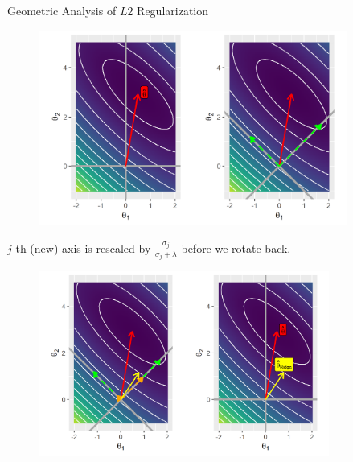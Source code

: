 \documentclass[11pt,compress,t,notes=noshow, xcolor=table]{beamer}
\begin{document}
\begin{vbframe}{Geometric Analysis of $L2$ Regularization}
\begin{figure}
\includegraphics[width=0.9\textwidth]{figure/l2_reg_hess_01.png}\\
\end{figure}




\framebreak
  
$j$-th (new) axis is rescaled by $\frac{\sigma_j}{\sigma_j + \lambda}$ before we rotate back.

\begin{figure}
\includegraphics[width=0.85\textwidth]{figure/l2_reg_hess_03.png}\\
\end{figure}



\end{vbframe}
\end{document}
